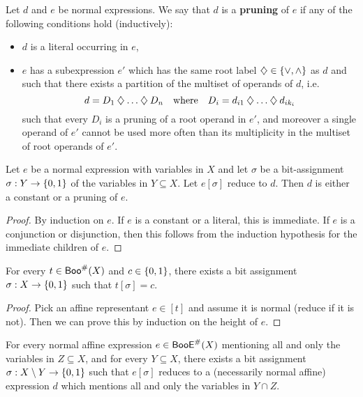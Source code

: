 \documentclass[a4paper]{memoir}
\begin{document}
\begin{definition} \label{def:bool:pruning}
	Let $d$ and $e$ be normal expressions. We say that $d$ is a \textbf{pruning} of $e$ if any of the following conditions hold (inductively):
	\begin{itemize}
		\item $d$ is a literal occurring in $e$,
		\item $e$ has a subexpression $e'$ which has the same root label ${\mathbin{\diamondsuit}} \in \mathopen{}\left\{ {\vee}, {\wedge} \right\}\mathclose{}$ as $d$ and such that there exists a partition of the multiset of operands of $d$, i.e.
		\[
			d = D_1 \mathbin{\diamondsuit} \ldots \mathbin{\diamondsuit} D_n
			\quad \text{where} \quad
			D_i = d_{i1} \mathbin{\diamondsuit} \ldots \mathbin{\diamondsuit} d_{ik_i}
		\]
		such that every $D_i$ is a pruning of a root operand in $e'$, and moreover a single operand of $e'$ cannot be used more often than its multiplicity in the multiset of root operands of $e'$.
	\end{itemize}
\end{definition}
\begin{proposition} \label{thm:bool:assign-pruning}
	Let $e$ be a normal expression with variables in $X$ and let $\sigma$ be a bit-assignment $\sigma : Y \to \mathopen{}\left\{ 0, 1 \right\}\mathclose{}$ of the variables in $Y \subseteq X$.
	Let $e[\sigma]$ reduce to $d$. Then $d$ is either a constant or a pruning of $e$.
\end{proposition}
\begin{proof}
	By induction on $e$. If $e$ is a constant or a literal, this is immediate.
	If $e$ is a conjunction or disjunction, then this follows from the induction hypothesis for the immediate children of $e$.
\end{proof}
\begin{lemma} \label{thm:boolexp-to-const-assignment}
	For every $t \in \mathsf{Boo}^\#(X)$ and $c \in \mathopen{}\left\{ 0, 1 \right\}\mathclose{}$, there exists a bit assignment $\sigma : X \to \mathopen{}\left\{ 0, 1 \right\}\mathclose{}$ such that $t[\sigma] = c$.
\end{lemma}
\begin{proof}
	Pick an affine representant $e \in [t]$ and assume it is normal (reduce if it is not).
	Then we can prove this by induction on the height of $e$.
\end{proof}
\begin{lemma} \label{thm:boolexp-to-pruning-assignment}
	For every normal affine expression $e \in \mathsf{BooE}^\#(X)$ mentioning all and only the variables in $Z \subseteq X$, and for every $Y \subseteq X$, there exists a bit assignment $\sigma : X \setminus Y \to \mathopen{}\left\{ 0, 1 \right\}\mathclose{}$ such that $e[\sigma]$ reduces to a (necessarily normal affine) expression $d$ which mentions all and only the variables in $Y \cap Z$.
\end{lemma}
\end{document}
